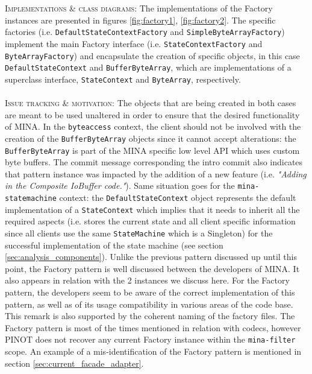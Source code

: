 \textsc{Implementations \& class diagrams}: The implementations of the Factory instances are presented in figures \ref{fig:factory1}, \ref{fig:factory2}. The specific factories (i.e. \texttt{DefaultStateContextFactory} and \texttt{SimpleByteArrayFactory}) implement the main Factory interface (i.e. \texttt{StateContextFactory} and \texttt{ByteArrayFactory}) and encapsulate the creation of specific objects, in this case \texttt{DefaultStateContext} and \texttt{BufferByteArray}, which are implementations of a superclass interface, \texttt{StateContext} and \texttt{ByteArray}, respectively. \\\\
\textsc{Issue tracking \& motivation}: The objects that are being created in both cases are meant to be used unaltered in order to ensure that the desired functionality of MINA. In the \texttt{byteaccess} context, the client should not be involved with the creation of the \texttt{BufferByteArray} objects since it cannot accept alterations: the \texttt{BufferByteArray} is part of the MINA specific low level API which uses custom byte buffers. The commit message corresponding the intro commit also indicates that pattern instance was impacted by the addition of a new feature (i.e. \textit{"Adding in the Composite IoBuffer code."}). Same situation goes for the \texttt{mina-statemachine} context: the \texttt{DefaultStateContext} object represents the default implementation of a \texttt{StateContext} which implies that it needs to inherit all the required aspects (i.e. stores the current state and all client specific information since all clients use the same \texttt{StateMachine} which is a Singleton) for the successful implementation of the state machine (see section \ref{sec:analysis_components}). Unlike the previous pattern discussed up until this point, the Factory pattern is well discussed between the developers of MINA. It also appears in relation with the 2 instances we discuss here. For the Factory pattern, the developers seem to be aware of the correct implementation of this pattern, as well as of its usage compatibility in various areas of the code base. This remark is also supported by the coherent naming of the factory files. The Factory pattern is most of the times mentioned in relation with codecs, however PINOT does not recover any current Factory instance within the \texttt{mina-filter} scope. An example of a mis-identification of the Factory pattern is mentioned in section \ref{sec:current_facade_adapter}.\\\\
